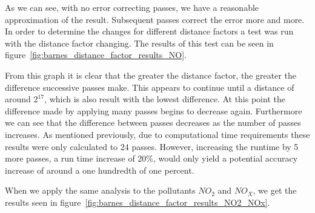         	As we can see, with no error correcting passes, we have a reasonable approximation of the result. Subsequent passes correct the error more and more. In order to determine the changes for different distance factors a test was run with the distance factor changing. The results of this test can be seen in figure~\ref{fig:barnes_distance_factor_results_NO}.


        	From this graph it is clear that the greater the distance factor, the greater the difference successive passes make. This appears to continue until a distance of around $2^{17}$, which is also result with the lowest difference. At this point the difference made by applying many passes begins to decrease again. Furthermore we can see that the difference between passes decreases as the number of passes increases. As mentioned previously, due to computational time requirements these results were only calculated to 24 passes. However, increasing the runtime by 5 more passes, a run time increase of 20\%, would only yield a potential accuracy increase of around a one hundredth of one percent. 

        	When we apply the same analysis to the pollutants $NO_{2}$ and $NO_{X}$, we get the results seen in figure~\ref{fig:barnes_distance_factor_results_NO2_NOx}. 

